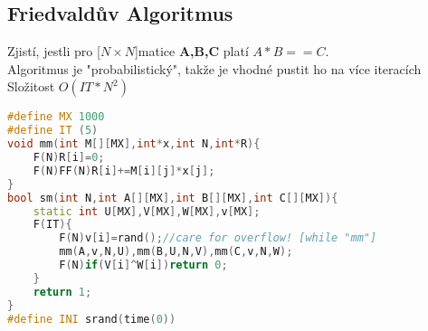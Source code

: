 \documentclass[11pt]{article}
\begin{document}
\subsection{Friedvaldův Algoritmus}
Zjistí, jestli pro [$N\times N$]matice \textbf{A,B,C} platí $A*B==C$.
\\Algoritmus je "probabilistický", takže je vhodné pustit ho na více iteracích
\\Složitost $O(IT*N^2)$
\begin{lstlisting}[language=C++]
#define MX 1000
#define IT (5)
void mm(int M[][MX],int*x,int N,int*R){
    F(N)R[i]=0;
    F(N)FF(N)R[i]+=M[i][j]*x[j];
}
bool sm(int N,int A[][MX],int B[][MX],int C[][MX]){
    static int U[MX],V[MX],W[MX],v[MX];
    F(IT){
        F(N)v[i]=rand();//care for overflow! [while "mm"]
        mm(A,v,N,U),mm(B,U,N,V),mm(C,v,N,W);
        F(N)if(V[i]^W[i])return 0;
    }
    return 1;
}
#define INI srand(time(0))
\end{lstlisting}
\end{document}
